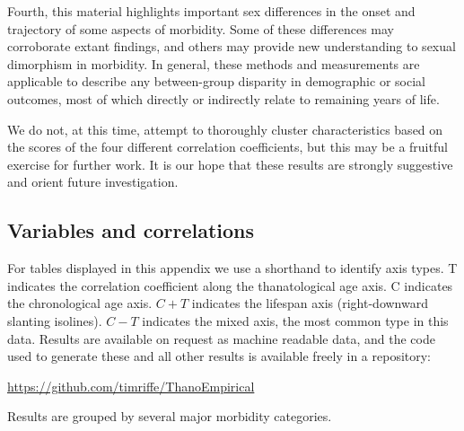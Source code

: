 \documentclass[11pt,oneside]{article} %
\begin{document}
Fourth,
this material highlights important sex differences in the onset and trajectory
of some aspects of morbidity. Some of these differences may
corroborate extant findings, and others may provide new understanding to sexual dimorphism in
morbidity. In general, these methods and measurements are applicable to describe
any between-group disparity in demographic or social outcomes, most of which
directly or indirectly relate to remaining years of life.

We do not, at this time, attempt to thoroughly cluster
characteristics based on the scores of the four different correlation
coefficients, but this may be a fruitful exercise for further work. It is our hope that these results are strongly suggestive and orient
future investigation.

\singlespacing

   
%  

%
\begin{appendices}
\section{Variables and correlations}



\end{appendices}

For tables displayed in this appendix we use a shorthand to identify axis types.
T indicates the correlation coefficient along the thanatological age axis. C
indicates the chronological age axis. $C+T$ indicates the lifespan axis
(right-downward slanting isolines). $C-T$ indicates the mixed axis, the
most common type in this data. Results are available on request as machine
readable data, and the code used to generate these and all other results is
available freely in a repository: 

\url{https://github.com/timriffe/ThanoEmpirical}

Results are grouped by several major morbidity categories. 

\listoftables
\end{document}
